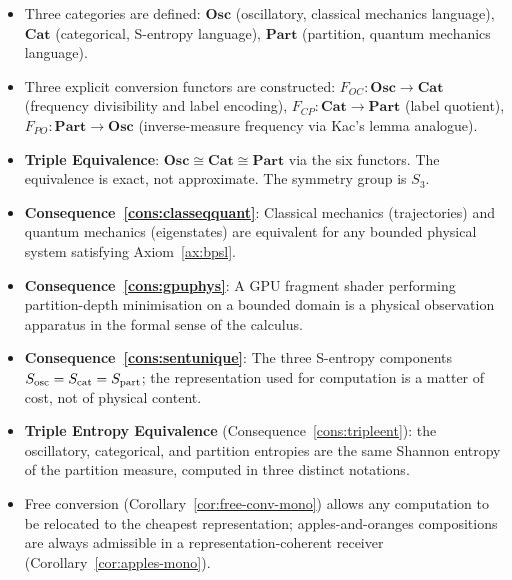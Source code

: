 \bigskip
\begin{tcolorbox}[colback=crowngold!10, colframe=crowngold!70!black,
                  title={\textbf{Chapter 15 Summary: The Union}}]
\begin{itemize}[noitemsep]
  \item Three categories are defined: $\mathbf{Osc}$ (oscillatory, classical
    mechanics language), $\mathbf{Cat}$ (categorical, S-entropy language),
    $\mathbf{Part}$ (partition, quantum mechanics language).
  \item Three explicit conversion functors are constructed:
    $F_{OC} : \mathbf{Osc} \to \mathbf{Cat}$ (frequency divisibility and
    label encoding),
    $F_{CP} : \mathbf{Cat} \to \mathbf{Part}$ (label quotient),
    $F_{PO} : \mathbf{Part} \to \mathbf{Osc}$ (inverse-measure frequency via
    Kac's lemma analogue).
  \item \textbf{Triple Equivalence}: $\mathbf{Osc} \cong \mathbf{Cat} \cong
    \mathbf{Part}$ via the six functors.  The equivalence is exact, not
    approximate.  The symmetry group is $S_3$.
  \item \textbf{Consequence~\ref{cons:classeqquant}}: Classical mechanics
    (trajectories) and quantum mechanics (eigenstates) are equivalent for any
    bounded physical system satisfying Axiom~\ref{ax:bpsl}.
  \item \textbf{Consequence~\ref{cons:gpuphys}}: A GPU fragment shader
    performing partition-depth minimisation on a bounded domain is a physical
    observation apparatus in the formal sense of the calculus.
  \item \textbf{Consequence~\ref{cons:sentunique}}: The three S-entropy
    components $S_{\mathrm{osc}} = S_{\mathrm{cat}} = S_{\mathrm{part}}$; the representation used for computation is
    a matter of cost, not of physical content.
  \item \textbf{Triple Entropy Equivalence}
    (Consequence~\ref{cons:tripleent}): the oscillatory, categorical, and
    partition entropies are the same Shannon entropy of the partition measure,
    computed in three distinct notations.
  \item Free conversion (Corollary~\ref{cor:free-conv-mono}) allows any
    computation to be relocated to the cheapest representation; apples-and-oranges
    compositions are always admissible in a representation-coherent receiver
    (Corollary~\ref{cor:apples-mono}).
\end{itemize}
\end{tcolorbox}
